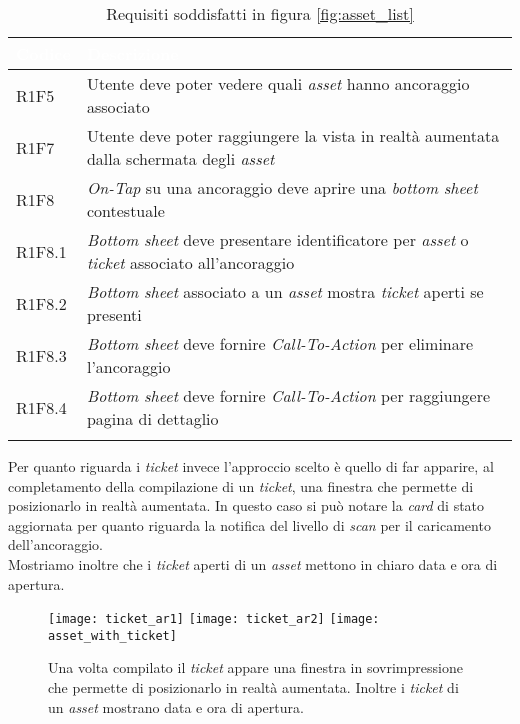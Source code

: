 {
    \setlength{\freewidth}{\dimexpr\textwidth-10\tabcolsep}
    \renewcommand{\arraystretch}{1.5}
    \centering
    \setlength{\aboverulesep}{0pt}
    \setlength{\belowrulesep}{0pt}
    \begin{longtable}{C{.15\freewidth} C{.965\freewidth}}
       \toprule
    \textcolor{white}{\textbf{Codice}}&
    \textcolor{white}{\textbf{Descrizione}}\\
    \toprule
    \endhead

    R1F5 & Utente deve poter vedere quali \textit{asset} hanno ancoraggio associato\\
    R1F7 & Utente deve poter raggiungere la vista in realtà aumentata dalla schermata degli \textit{asset}\\
    R1F8 & \textit{On-Tap} su una ancoraggio deve aprire una \textit{bottom sheet} contestuale\\
    R1F8.1 & \textit{Bottom sheet} deve presentare identificatore per \textit{asset} o \textit{ticket} associato all'ancoraggio\\
    R1F8.2 & \textit{Bottom sheet} associato a un \textit{asset} mostra \textit{ticket} aperti se presenti\\
    R1F8.3 & \textit{Bottom sheet} deve fornire \textit{Call-To-Action} per eliminare l'ancoraggio\\
    R1F8.4 & \textit{Bottom sheet} deve fornire \textit{Call-To-Action} per raggiungere pagina di dettaglio\\
    

    \bottomrule
    \caption{Requisiti soddisfatti in figura \ref{fig:asset_list}}
    \end{longtable}
}

Per quanto riguarda i \textit{ticket} invece l'approccio scelto è quello di far apparire, al completamento della compilazione di un \textit{ticket}, una finestra che permette di posizionarlo in realtà aumentata. In questo caso si può notare la \textit{card} di stato aggiornata per quanto riguarda la notifica del livello di \textit{scan} per il caricamento dell'ancoraggio.\\
Mostriamo inoltre che i \textit{ticket} aperti di un \textit{asset} mettono in chiaro data e ora di apertura.

\begin{figure}[H]
  \centering
  \texttt{[image: ticket\_ar1]}\hfill
  \texttt{[image: ticket\_ar2]}\hfill
  \texttt{[image: asset\_with\_ticket]}
  \caption[Caricamento \textit{ticket} realtà aumentata e \textit{ticket} su \textit{asset}]{Una volta compilato il \textit{ticket} appare una finestra in sovrimpressione che permette di posizionarlo in realtà aumentata. Inoltre i \textit{ticket} di un \textit{asset} mostrano data e ora di apertura.}
  \label{fig:ticket_ar}
\end{figure}

